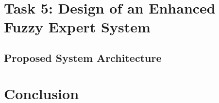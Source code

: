 \documentclass{article}
\begin{document}
\section{Task 5: Design of an Enhanced Fuzzy Expert System}


\subsection{Proposed System Architecture}


\section{Conclusion}



\printbibliography
\end{document}

